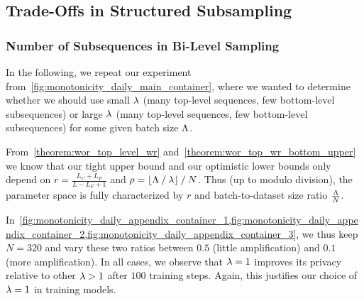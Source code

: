 \subsection{Trade-Offs in Structured Subsampling}\label{appendix:extra_experiments_eval_pld}

\subsubsection{Number of Subsequences in Bi-Level Sampling}\label{appendix:extra_experiments_eval_pld_number_of_subsequences}
In the following, we repeat our experiment from~\cref{fig:monotonicity_daily_main_container},
where we wanted to determine whether we should use small $\lambda$ (many top-level sequences, few bottom-level subsequences)
or large $\lambda$ (many top-level sequences, few bottom-level subsequences)
for some given batch size $\Lambda$.

From~\cref{theorem:wor_top_level_wr} and~\cref{theorem:wor_top_wr_bottom_upper}
we know that our tight upper bound and our optimistic lower bounds only
depend on $r = \frac{L_C + L_F}{L - L_F + 1}$ and $\rho = \lfloor \Lambda \mathbin{/} \lambda \rfloor \mathbin{/} N$.
Thus (up to modulo division), the parameter space is fully characterized
by $r$ and batch-to-dataset size ratio $\frac{\Lambda}{N}$.

In~\cref{fig:monotonicity_daily_appendix_container_1,fig:monotonicity_daily_appendix_container_2,fig:monotonicity_daily_appendix_container_3}, we thus keep $N = 320$ and vary these two ratios between
$0.5$ (little amplification) and $0.1$ (more amplification).
In all cases, we observe that $\lambda = 1$ improves 
its privacy relative to other $\lambda > 1$ after $100$ training steps. 
Again, this justifies our choice of $\lambda = 1$ in training models.


